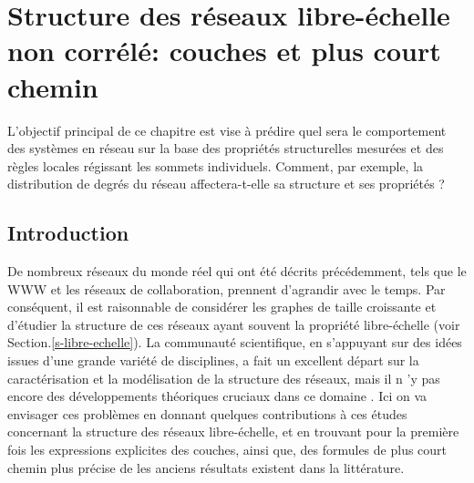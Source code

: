 \newcommand{\nl}{$n_{\ell}$ }
\newcommand{\km}{\textless k \textgreater}
\chapter{Structure des réseaux libre-échelle non corrélé: couches et plus court chemin}
\label{sec3}
L'objectif principal de ce chapitre est vise à prédire quel sera le comportement des systèmes en réseau sur la base des propriétés structurelles mesurées et des règles locales régissant les sommets individuels. Comment, par exemple, la distribution de degrés du réseau affectera-t-elle sa  structure et ses propriétés ?

\section{Introduction}

De nombreux réseaux du monde réel qui ont été décrits précédemment, tels que le WWW et les réseaux de collaboration, prennent d'agrandir avec le temps. Par conséquent, il est raisonnable de considérer les graphes de taille croissante et d'étudier la structure de ces réseaux ayant souvent la propriété libre-échelle (voir Section.\ref{s-libre-echelle}). 
La communauté scientifique, en s'appuyant sur des idées issues d'une grande variété de disciplines, a fait un excellent départ sur la caractérisation et la modélisation de la structure des réseaux, mais il n 'y pas encore des développements théoriques cruciaux dans ce domaine \cite{Ne2003}. Ici on va envisager ces problèmes en donnant quelques contributions à ces études concernant la structure des réseaux libre-échelle, et en trouvant pour la première fois les expressions explicites des couches, ainsi que, des formules de plus court chemin plus précise de les anciens résultats existent dans la littérature. 
